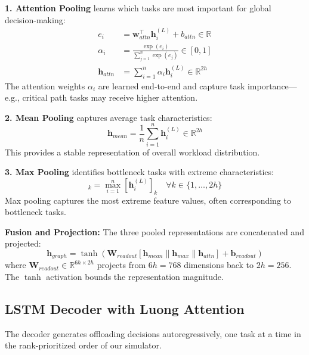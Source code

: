 \documentclass[journal,twoside]{IEEEtran}
\newcommand{\R}{\mathbb{R}}
\begin{document}
\textbf{1. Attention Pooling} learns which tasks are most important for global decision-making:
\begin{align}
e_i &= \mathbf{w}_{attn}^\top \mathbf{h}_i^{(L)} + b_{attn} \in \R \label{eq:attn_score}\\
\alpha_i &= \frac{\exp(e_i)}{\sum_{j=1}^{n} \exp(e_j)} \in [0, 1] \label{eq:attn_weight}\\
\mathbf{h}_{attn} &= \sum_{i=1}^{n} \alpha_i \mathbf{h}_i^{(L)} \in \R^{2h} \label{eq:attn_pool}
\end{align}
The attention weights $\alpha_i$ are learned end-to-end and capture task importance---e.g., critical path tasks may receive higher attention.

\textbf{2. Mean Pooling} captures average task characteristics:
    \begin{equation}
\mathbf{h}_{mean} = \frac{1}{n} \sum_{i=1}^{n} \mathbf{h}_i^{(L)} \in \R^{2h}
\label{eq:mean_pool}
    \end{equation}
This provides a stable representation of overall workload distribution.

\textbf{3. Max Pooling} identifies bottleneck tasks with extreme characteristics:
    \begin{equation}
[\mathbf{h}_{max}]_k = \max_{i=1}^{n} [\mathbf{h}_i^{(L)}]_k \quad \forall k \in \{1, \ldots, 2h\}
\label{eq:max_pool}
    \end{equation}
Max pooling captures the most extreme feature values, often corresponding to bottleneck tasks.

\textbf{Fusion and Projection:}
The three pooled representations are concatenated and projected:
\begin{equation}
\mathbf{h}_{graph} = \tanh\left( \mathbf{W}_{readout} \left[ \mathbf{h}_{mean} \| \mathbf{h}_{max} \| \mathbf{h}_{attn} \right] + \mathbf{b}_{readout} \right)
\label{eq:readout_fusion}
\end{equation}
where $\mathbf{W}_{readout} \in \R^{6h \times 2h}$ projects from $6h = 768$ dimensions back to $2h = 256$. The $\tanh$ activation bounds the representation magnitude.

\subsection{LSTM Decoder with Luong Attention}

The decoder generates offloading decisions autoregressively, one task at a time in the rank-prioritized order of our simulator.
\end{document}

